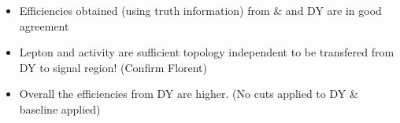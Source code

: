 \documentclass{beamer}
\begin{document}
\begin{frame}
\begin{columns}
\begin{column}{0.33\textwidth}
   \end{column}
  \end{columns}
\begin{itemize}
 \item Efficiencies obtained (using truth information) from \ttbar \& \wpj and DY are in good agreement
 \item Lepton \pt and activity are sufficient topology independent to be transfered from DY to signal region! (Confirm Florent)
 \item Overall the efficiencies from DY are higher. (No cuts applied to DY \ttbar \& \wpj baseline applied)
\end{itemize}
\end{frame}
\end{document}
